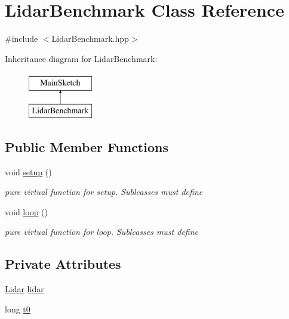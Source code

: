 \hypertarget{classLidarBenchmark}{\section{Lidar\-Benchmark Class Reference}
\label{classLidarBenchmark}
}


{\ttfamily \#include $<$Lidar\-Benchmark.\-hpp$>$}

Inheritance diagram for Lidar\-Benchmark\-:\begin{figure}[H]
\begin{center}
\leavevmode
\includegraphics[height=2.000000cm]{classLidarBenchmark}
\end{center}
\end{figure}
\subsection*{Public Member Functions}
\begin{DoxyCompactItemize}
\item 
void \hyperlink{classLidarBenchmark_a8e8ccd212f927ba3ca36bc1e3daba4ec}{setup} ()
\begin{DoxyCompactList}\small\item\em pure virtual function for setup. Sublcasses must define \end{DoxyCompactList}\item 
void \hyperlink{classLidarBenchmark_a0bfe575d370277a4e594bcae1b6f9a1a}{loop} ()
\begin{DoxyCompactList}\small\item\em pure virtual function for loop. Sublcasses must define \end{DoxyCompactList}\end{DoxyCompactItemize}
\subsection*{Private Attributes}
\begin{DoxyCompactItemize}
\item 
\hyperlink{classLidar}{Lidar} \hyperlink{classLidarBenchmark_a559db88ad7e51c4c254ce241c0361ab6}{lidar}
\item 
long \hyperlink{classLidarBenchmark_a5527736a3831d0a04d8158748e8f2b48}{t0}
\end{DoxyCompactItemize}



